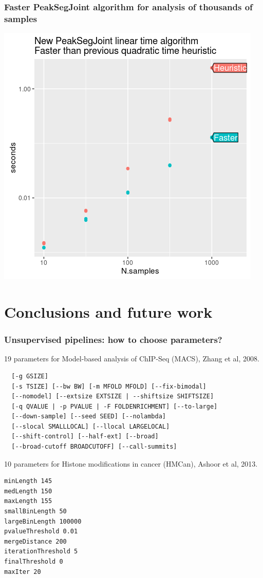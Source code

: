 \documentclass{beamer}
\begin{document}
\begin{frame}
  \frametitle{Faster PeakSegJoint algorithm for analysis of thousands of samples}
  
\includegraphics[width=0.7\textheight]{figure-PeakSegJointFaster-timings.png}
\end{frame}


\section{Conclusions and future work}

\begin{frame}[fragile]
  \frametitle{Unsupervised pipelines: how to choose parameters?}
\scriptsize
19 parameters for Model-based analysis of ChIP-Seq (MACS), Zhang et al, 2008.
\begin{verbatim}
  [-g GSIZE]
  [-s TSIZE] [--bw BW] [-m MFOLD MFOLD] [--fix-bimodal]
  [--nomodel] [--extsize EXTSIZE | --shiftsize SHIFTSIZE]
  [-q QVALUE | -p PVALUE | -F FOLDENRICHMENT] [--to-large]
  [--down-sample] [--seed SEED] [--nolambda]
  [--slocal SMALLLOCAL] [--llocal LARGELOCAL]
  [--shift-control] [--half-ext] [--broad]
  [--broad-cutoff BROADCUTOFF] [--call-summits]
\end{verbatim}
10 parameters for Histone modifications in cancer (HMCan),
Ashoor et al, 2013.
\begin{verbatim}
minLength 145
medLength 150
maxLength 155
smallBinLength 50
largeBinLength 100000
pvalueThreshold 0.01
mergeDistance 200
iterationThreshold 5
finalThreshold 0
maxIter 20
\end{verbatim}
\end{frame}
\end{document}
